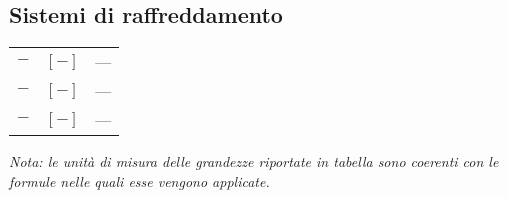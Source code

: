 \begin{multicols}{2}
	\subsection{Sistemi di raffreddamento}
	\begin{tabular}{ccl}
		$\bm{-}$ & $[-]$ & --- \\
		$\bm{-}$ & $[-]$ & --- \\
		$\bm{-}$ & $[-]$ & ---
	\end{tabular}

\end{multicols}

\textit{Nota: le unità di misura delle grandezze riportate in tabella sono coerenti con le formule nelle quali esse vengono applicate.}